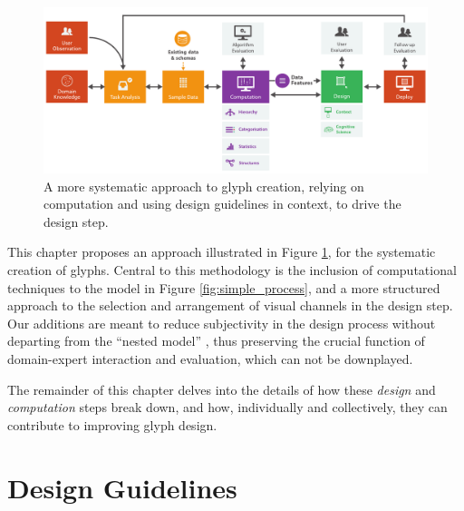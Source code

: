 \begin{figure}[h!]
\centering
\includegraphics[width=\textwidth]{images/ch3/model_horizontal_new}
\caption{A more systematic approach to glyph creation, relying on computation and using design guidelines in context, to drive the design step.}
\label{fig:new_process}
\end{figure}

This chapter proposes an approach illustrated in Figure \ref{fig:new_process}, for the systematic creation of glyphs.
Central to this methodology is the inclusion of computational techniques to the model in Figure \ref{fig:simple_process}, and a more structured approach to the selection and arrangement of visual channels in the design step.
Our additions are meant to reduce subjectivity in the design process without departing from the ``nested model'' \cite{munzner2009nested}, thus preserving the crucial function of domain-expert interaction and evaluation, which can not be downplayed.

The remainder of this chapter delves into the details of how these \emph{design} and \emph{computation} steps break down, and how, individually and collectively, they can contribute to improving glyph design.

\section{Design Guidelines}

